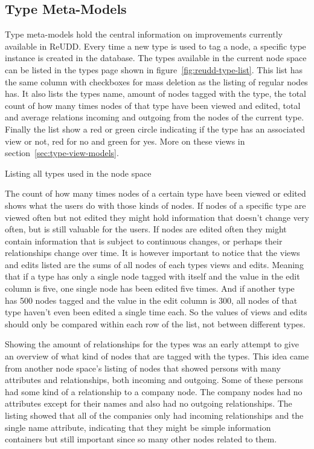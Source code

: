 \documentclass[a4paper]{report}
\begin{document}
\subsection{Type Meta-Models}
Type meta-models hold the central information on improvements currently available in ReUDD. Every time a new type is used to tag a node, a specific type instance is created in the database. The types available in the current node space can be listed in the types page shown in figure~\ref{fig:reudd-type-list}. This list has the same column with checkboxes for mass deletion as the listing of regular nodes has. It also lists the types name, amount of nodes tagged with the type, the total count of how many times nodes of that type have been viewed and edited, total and average relations incoming and outgoing from the nodes of the current type. Finally the list show a red or green circle indicating if the type has an associated view or not, red for no and green for yes. More on these views in section~\ref{sec:type-view-models}.

	{Listing all types used in the node space}

The count of how many times nodes of a certain type have been viewed or edited shows what the users do with those kinds of nodes. If nodes of a specific type are viewed often but not edited they might hold information that doesn't change very often, but is still valuable for the users. If nodes are edited often they might contain information that is subject to continuous changes, or perhaps their relationships change over time. It is however important to notice that the views and edits listed are the sums of all nodes of each types views and edits. Meaning that if a type has only a single node tagged with itself and the value in the edit column is five, one single node has been edited five times. And if another type has 500 nodes tagged and the value in the edit column is 300, all nodes of that type haven't even been edited a single time each. So the values of views and edits should only be compared within each row of the list, not between different types.

Showing the amount of relationships for the types was an early attempt to give an overview of what kind of nodes that are tagged with the types. This idea came from another node space's listing of nodes that showed persons with many attributes and relationships, both incoming and outgoing. Some of these persons had some kind of a relationship to a company node. The company nodes had no attributes except for their names and also had no outgoing relationships. The listing showed that all of the companies only had incoming relationships and the single name attribute, indicating that they might be simple information containers but still important since so many other nodes related to them.
\end{document}
